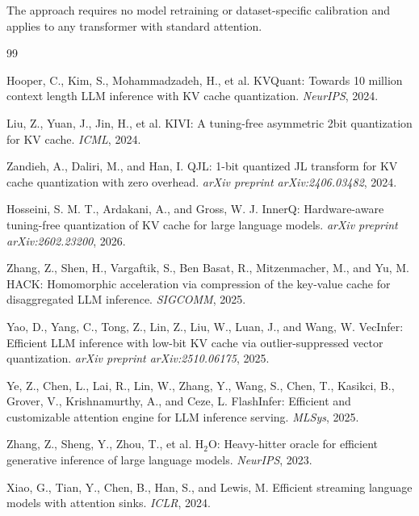\documentclass[11pt,a4paper]{article}
\theoremstyle{definition}
\theoremstyle{remark}
\begin{document}
The approach requires no model retraining or dataset-specific calibration and applies to any transformer with standard attention.



\begin{thebibliography}{99}

Hooper, C., Kim, S., Mohammadzadeh, H., et al.
\newblock KVQuant: Towards 10 million context length LLM inference with KV cache quantization.
\newblock \emph{NeurIPS}, 2024.

Liu, Z., Yuan, J., Jin, H., et al.
\newblock KIVI: A tuning-free asymmetric 2bit quantization for KV cache.
\newblock \emph{ICML}, 2024.

Zandieh, A., Daliri, M., and Han, I.
\newblock QJL: 1-bit quantized JL transform for KV cache quantization with zero overhead.
\newblock \emph{arXiv preprint arXiv:2406.03482}, 2024.

Hosseini, S. M. T., Ardakani, A., and Gross, W. J.
\newblock InnerQ: Hardware-aware tuning-free quantization of KV cache for large language models.
\newblock \emph{arXiv preprint arXiv:2602.23200}, 2026.

Zhang, Z., Shen, H., Vargaftik, S., Ben Basat, R., Mitzenmacher, M., and Yu, M.
\newblock HACK: Homomorphic acceleration via compression of the key-value cache for disaggregated LLM inference.
\newblock \emph{SIGCOMM}, 2025.

Yao, D., Yang, C., Tong, Z., Lin, Z., Liu, W., Luan, J., and Wang, W.
\newblock VecInfer: Efficient LLM inference with low-bit KV cache via outlier-suppressed vector quantization.
\newblock \emph{arXiv preprint arXiv:2510.06175}, 2025.

Ye, Z., Chen, L., Lai, R., Lin, W., Zhang, Y., Wang, S., Chen, T., Kasikci, B., Grover, V., Krishnamurthy, A., and Ceze, L.
\newblock FlashInfer: Efficient and customizable attention engine for LLM inference serving.
\newblock \emph{MLSys}, 2025.

Zhang, Z., Sheng, Y., Zhou, T., et al.
\newblock H$_2$O: Heavy-hitter oracle for efficient generative inference of large language models.
\newblock \emph{NeurIPS}, 2023.

Xiao, G., Tian, Y., Chen, B., Han, S., and Lewis, M.
\newblock Efficient streaming language models with attention sinks.
\newblock \emph{ICLR}, 2024.


\end{thebibliography}
\end{document}
